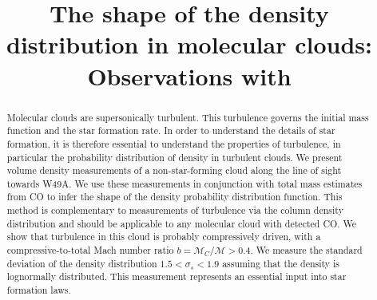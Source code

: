 \title{The shape of the density distribution in molecular clouds: Observations with
\formaldehyde}
\begin{abstract}
    Molecular clouds are supersonically turbulent.  This turbulence governs
    the initial mass function and the star formation rate.  In order to
    understand the details of star formation, it is therefore essential to understand
    the properties of turbulence, in particular the probability distribution of
    density in turbulent clouds.
    We present \formaldehyde volume density measurements of a non-star-forming
    cloud along the line of sight towards W49A. We use these measurements in
    conjunction with total mass estimates from CO to infer the shape of the
    density probability distribution function.  This method is complementary to
    measurements of turbulence via the column density distribution and should
    be applicable to any molecular cloud with detected CO.  We show that
    turbulence in this cloud is probably compressively driven, with a
    compressive-to-total Mach number ratio $b = \mathcal{M}_C/\mathcal{M}>0.4$.  
    We measure the standard deviation of the density distribution $1.5 < \sigma_s < 1.9$
    assuming that the density is lognormally distributed.  This measurement
    represents an essential input into star formation laws.



\end{abstract}

